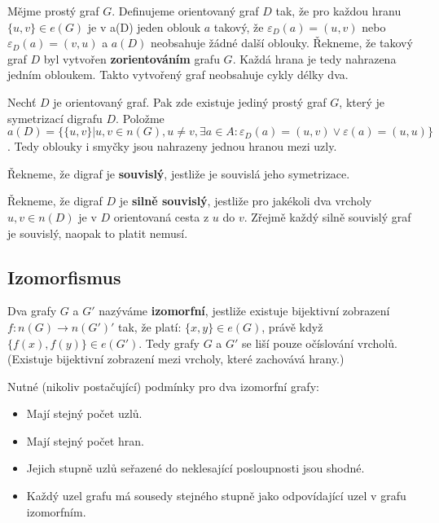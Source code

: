 \begin{definition}
Mějme prostý graf $G$. Definujeme orientovaný graf $D$ tak, že pro každou hranu $\{ u, v \} \in e(G)$ je v a(D) jeden oblouk $a$ takový, že $\varepsilon_D (a) = (u, v)$ nebo $\varepsilon_D (a) = (v,u)$ a $a(D)$ neobsahuje žádné další oblouky. Řekneme, že takový graf $D$ byl vytvořen \textbf{zorientováním} grafu $G$. Každá hrana je tedy nahrazena jedním obloukem. Takto vytvořený graf neobsahuje cykly délky dva.
\end{definition}

\begin{definition}
Nechť $D$ je orientovaný graf. Pak zde existuje jediný prostý graf $G$, který je symetrizací digrafu $D$. Položme $a(D) = \{ \{ u, v \} | u, v \in n(G), u \neq v, \exists a \in A : \varepsilon_D (a) = (u,v) \vee \varepsilon (a) = (u, u) \}$. Tedy oblouky i smyčky jsou nahrazeny jednou hranou mezi uzly.
\end{definition}

\begin{definition}
Řekneme, že digraf je \textbf{souvislý}, jestliže je souvislá jeho symetrizace.
\end{definition}

\begin{definition}
Řekneme, že digraf $D$ je \textbf{silně souvislý}, jestliže pro jakékoli dva vrcholy $u, v \in n(D)$ je v $D$ orientovaná cesta z $u$ do $v$. Zřejmě každý silně souvislý graf je souvislý, naopak to platit nemusí.
\end{definition}

\subsection{Izomorfismus}

\begin{definition}
Dva grafy $G$ a $G'$ nazýváme \textbf{izomorfní}, jestliže existuje bijektivní zobrazení $f: n(G) \rightarrow n(G')'$ tak, že platí:
$\{ x, y \} \in e(G)$, právě když $\{f(x), f(y) \} \in e(G')$. Tedy grafy $G$ a $G'$ se liší pouze očíslování vrcholů. (Existuje bijektivní zobrazení mezi vrcholy, které zachovává hrany.)
\end{definition}

\begin{theorem}
Nutné (nikoliv postačující) podmínky pro dva izomorfní grafy:
\begin{itemize}
    \item Mají stejný počet uzlů.
    \item Mají stejný počet hran.
    \item Jejich stupně uzlů seřazené do neklesající posloupnosti jsou shodné.
    \item Každý uzel grafu má sousedy stejného stupně jako odpovídající uzel v grafu izomorfním.
\end{itemize}
\end{theorem}


